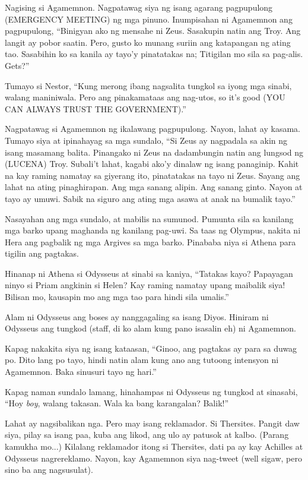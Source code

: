 \documentclass[12pt,letterpaper]{report}
\begin{document}
Nagising si Agamemnon. Nagpatawag siya ng isang agarang pagpupulong (EMERGENCY MEETING) ng mga pinuno. Inumpisahan ni Agamemnon ang pagpupulong, ``Binigyan ako ng mensahe ni Zeus. Sasakupin natin ang Troy. Ang langit ay pobor saatin. Pero, gusto ko munang suriin ang katapangan ng ating tao. Sasabihin ko sa kanila ay tayo'y pinatatakas na; Titigilan mo sila sa pag-alis. Gets?''

Tumayo si Nestor, ``Kung merong ibang nagsalita tungkol sa iyong mga sinabi, walang maniniwala. Pero ang pinakamataas ang nag-utos, so it's good (YOU CAN ALWAYS TRUST THE GOVERNMENT).''

Nagpatawag si Agamemnon ng ikalawang pagpupulong. Nayon, lahat ay kasama. Tumayo siya at ipinahayag sa mga sundalo, ``Si Zeus ay nagpadala sa akin ng isang masamang balita. Pinangako ni Zeus na dadambungin natin ang lungsod ng (LUCENA) Troy. Subali't lahat, kagabi ako'y dinalaw ng isang panaginip. Kahit na kay raming namatay sa giyerang ito, pinatatakas na tayo ni Zeus. Sayang ang lahat na ating pinaghirapan. Ang mga sanang alipin. Ang sanang ginto. Nayon at tayo ay umuwi. Sabik na siguro ang  ating mga asawa at anak na bumalik tayo.''

Nasayahan ang mga sundalo, at mabilis na sumunod. Pumunta sila sa kanilang mga barko upang maghanda ng kanilang pag-uwi. Sa taas ng Olympus, nakita ni Hera ang pagbalik ng mga Argives sa mga barko. Pinababa niya si Athena para tigilin ang pagtakas.

Hinanap ni Athena si Odysseus at sinabi sa kaniya, ``Tatakas kayo? Papayagan ninyo si Priam angkinin si Helen? Kay raming namatay upang maibalik siya! Bilisan mo, kausapin mo ang mga tao para hindi sila umalis.''

Alam ni Odysseus ang boses ay nanggagaling sa isang Diyos. Hiniram ni Odysseus ang tungkod (staff, di ko alam kung pano isasalin eh) ni Agamemnon.

Kapag nakakita siya ng isang kataasan, ``Ginoo, ang pagtakas ay para sa duwag po. Dito lang po tayo, hindi natin alam kung ano ang tutoong intensyon ni Agamemnon. Baka sinusuri tayo ng hari.''

Kapag naman sundalo lamang, hinahampas ni Odysseus ng tungkod at sinasabi, ``Hoy \textit{boy}, walang takasan. Wala ka bang karangalan? Balik!''

Lahat ay nagsibalikan nga. Pero may isang reklamador. Si Thersites. Pangit daw siya, pilay sa isang paa, kuba ang likod, ang ulo ay patusok at kalbo. (Parang kamukha mo...) Kilalang reklamador itong si Thersites, dati pa ay kay Achilles at Odysseus nagrereklamo. Nayon, kay Agamemnon siya nag-tweet (well sigaw, pero sino ba ang nagsusulat).
\end{document}
